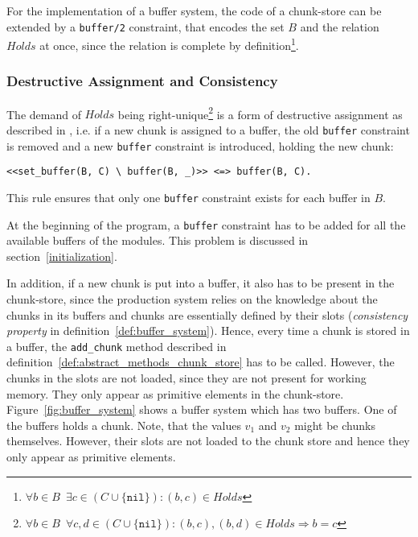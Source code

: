 For the implementation of a buffer system, the code of a chunk-store can be extended by a \lstinline|buffer/2| constraint, that encodes the set $B$ and the relation $Holds$ at once, since the relation is complete by definition\footnote{$\forall b \in B \enspace \exists c \in (C \cup \{ \mathtt{nil} \}): (b,c) \in Holds$}.

\subsubsection{Destructive Assignment and Consistency}
\label{destructive_assignment}

The demand of $Holds$ being right-unique\footnote{$\forall b \in B \enspace \forall c, d \in (C \cup \{ \mathtt{nil} \}): (b,c), (b,d) \in Holds \Rightarrow b = c$} is a form of destructive assignment as described in \cite[p. 32]{fru_chr_book_2009}, i.e. if a new chunk is assigned to a buffer, the old \lstinline|buffer| constraint is removed and a new \lstinline|buffer| constraint is introduced, holding the new chunk:

\begin{lstlisting}
<<set_buffer(B, C) \ buffer(B, _)>> <=> buffer(B, C).
\end{lstlisting}

This rule ensures that only one \lstinline|buffer| constraint exists for each buffer in $B$.

At the beginning of the program, a \lstinline|buffer| constraint has to be added for all the available buffers of the modules. This problem is discussed in section~\ref{initialization}.

In addition, if a new chunk is put into a buffer, it also has to be present in the chunk-store, since the production system relies on the knowledge about the chunks in its buffers and chunks are essentially defined by their slots (\emph{consistency property} in definition~\ref{def:buffer_system}). Hence, every time a chunk is stored in a buffer, the \lstinline|add_chunk| method described in definition~\ref{def:abstract_methods_chunk_store} has to be called. However, the chunks in the slots are not loaded, since they are not present for working memory. They only appear as primitive elements in the chunk-store. Figure~\ref{fig:buffer_system} shows a buffer system which has two buffers. One of the buffers holds a chunk. Note, that the values $v_1$ and $v_2$ might be chunks themselves. However, their slots are not loaded to the chunk store and hence they only appear as primitive elements.

